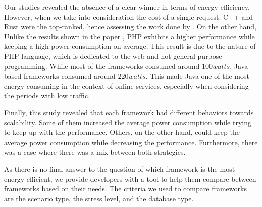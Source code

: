 Our studies revealed the absence of a clear winner in terms of energy efficiency.
However, when we take into consideration the cost of a single request.
C++ and Rust were the top-ranked, hence assessing the work done by \citeauthor{pereira_energy_2017}.
On the other hand, Unlike the results shown in the paper \cite{pereira_energy_2017}, \textsf{PHP} exhibits a higher performance while keeping a high power consumption on average.
This result is due to the nature of \textsf{PHP} language, which is dedicated to the web and not general-purpose programming. 
While most of the frameworks consumed around $100 watts$, \textsf{Java}-based frameworks consumed around $220 watts$.
This made \textsf{Java} one of the most energy-consuming in the context of online services, especially when considering the periods with low traffic.  

Finally, this study revealed that each framework had different behaviors towards scalability.
Some of them increased the average power consumption while trying to keep up with the performance.
Others, on the other hand, could keep the average power consumption while decreasing the performance.
Furthermore, there was a case where there was a mix between both strategies. 

As there is no final answer to the question of which framework is the most energy-efficient, we provide developers with a tool to help them compare between frameworks based on their needs.
The criteria we used to compare frameworks are the scenario type, the stress level, and the database type.


